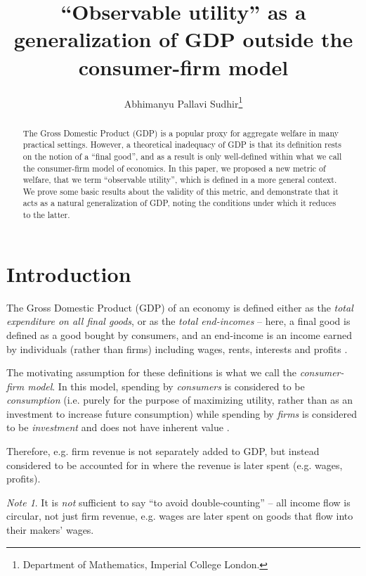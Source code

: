 \documentclass{journal}
\title{``Observable utility'' as a generalization of GDP outside the consumer-firm model}
\author{Abhimanyu Pallavi Sudhir\thanks{Department of Mathematics, Imperial College London.}}
\theoremstyle{plain}
\theoremstyle{definition}
\theoremstyle{remark}
\newtheorem*{note*}{Note}
\begin{document}
\maketitle

\begin{abstract}
    The Gross Domestic Product (GDP) is a popular proxy for aggregate welfare in many practical settings. However, a theoretical inadequacy of GDP is that its definition rests on the notion of a ``final good'', and as a result is only well-defined within what we call the consumer-firm model of economics. In this paper, we proposed a new metric of welfare, that we term ``observable utility'', which is defined in a more general context. We prove some basic results about the validity of this metric, and demonstrate that it acts as a natural generalization of GDP, noting the conditions under which it reduces to the latter.
    
\end{abstract}

\section{Introduction}
\label{sec:intro}

The Gross Domestic Product (GDP) of an economy is defined either as the \emph{total expenditure on all final goods}, or as the \emph{total end-incomes} -- here, a final good is defined as a good bought by consumers, and an end-income is an income earned by individuals (rather than firms) including wages, rents, interests and profits \cite{bea}. 

The motivating assumption for these definitions is what we call the \emph{consumer-firm model}. In this model, spending by \emph{consumers} is considered to be \emph{consumption} (i.e. purely for the purpose of maximizing utility, rather than as an investment to increase future consumption) while spending by \emph{firms} is considered to be \emph{investment} and does not have inherent value \cite{firm}.

Therefore, e.g. firm revenue is not separately added to GDP, but instead considered to be accounted for in where the revenue is later spent (e.g. wages, profits).

\begin{note*}
    It is \emph{not} sufficient to say ``to avoid double-counting'' -- all income flow is circular, not just firm revenue, e.g. wages are later spent on goods that flow into their makers' wages.
\end{note*}
\end{document}
